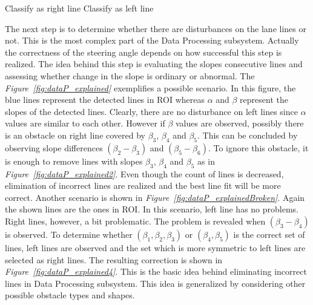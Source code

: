 \documentclass[a4paper,12pt]{article}
\begin{document}
\begin{enumerate}
\begin{algorithm}[H]
{ 
	{
		Classify as right line 
	}
	\Else
	{
		Classify as left line 
	}
}
\end{algorithm}
	
	The next step is to determine whether there are disturbances on the lane lines or not. This is the most complex part of the Data Processing subsystem. Actually the correctness of the steering angle depends on how successful this step is realized. The idea behind this step is evaluating the slopes consecutive lines and assessing whether change in the slope is ordinary or abnormal. The \textit{Figure~\ref{fig:dataP_explained}} exemplifies a possible scenario. In this figure, the blue lines represent the detected lines in ROI whereas $\alpha$ and $\beta$ represent the slopes of the detected lines. Clearly, there are no disturbance on left lines since $\alpha$ values are similar to each other. However if $\beta$ values are observed, possibly there is an obstacle on right line covered by $\beta_3$, $\beta_4$ and $\beta_5$. This can be concluded by observing slope differences $(\beta_2 - \beta_3)$ and $(\beta_5 - \beta_6)$. To ignore this obstacle, it is enough to remove lines with slopes $\beta_3$, $\beta_4$ and $\beta_5$ as in \textit{Figure~\ref{fig:dataP_explained2}}. Even though the count of lines is decreased, elimination of incorrect lines are realized and the best line fit will be more correct. Another scenario is shown in \textit{Figure~\ref{fig:dataP_explainedBroken}}. Again the shown lines are the ones in ROI. In this scenario, left line has no problems. Right lines, however, a bit problematic. The problem is revealed when  $(\beta_3 - \beta_4)$ is observed. To determine whether  $(\beta_1, \beta_2, \beta_3)$ or $(\beta_4, \beta_5)$ is the correct set of lines, left lines are observed and the set which is more symmetric to left lines are selected as right lines. The resulting correction is shown in \textit{Figure~\ref{fig:dataP_explained4}}.	This is the basic idea behind eliminating incorrect lines in Data Processing subsystem. This idea is generalized by considering other possible obstacle types and shapes.


\end{enumerate}
\end{document}
